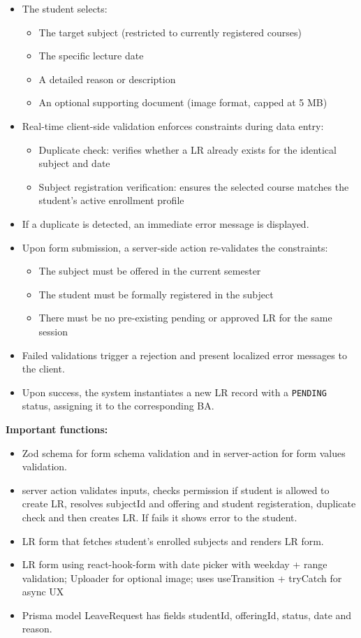 \begin{itemize}
\item The student selects:
\begin{itemize}
\item The target subject (restricted to currently registered courses)
\item The specific lecture date
\item A detailed reason or description
\item An optional supporting document (image format, capped at 5 MB)
\end{itemize}
\item Real-time client-side validation enforces constraints during data entry:
\begin{itemize}
\item Duplicate check: verifies whether a LR already exists for the identical subject and date
\item Subject registration verification: ensures the selected course matches the student's active enrollment profile
\end{itemize}
\item If a duplicate is detected, an immediate error message is displayed.
\item Upon form submission, a server-side action re-validates the constraints:
  \begin{itemize}
  \item The subject must be offered in the current semester
  \item The student must be formally registered in the subject
  \item There must be no pre-existing pending or approved LR for the same session
  \end{itemize}
\item Failed validations trigger a rejection and present localized error messages to the client. 
\item Upon success, the system instantiates a new LR record with a \texttt{PENDING} status, assigning it to the corresponding BA.
\end{itemize}

\textbf{Important functions:}

\begin{itemize}
    \item Zod schema for form schema validation and in server-action for form values validation.
    \item server action validates inputs, checks permission if student is allowed to create LR, resolves subjectId and offering and student registeration, duplicate check and then creates LR. If fails it shows error to the student.
    \item LR form that fetches student's enrolled subjects and renders LR form.
    \item LR form using react-hook-form with date picker with weekday + range validation; Uploader for optional image; uses useTransition + tryCatch for async UX
    \item Prisma model LeaveRequest has fields studentId, offeringId, status, date and reason.
\end{itemize}

